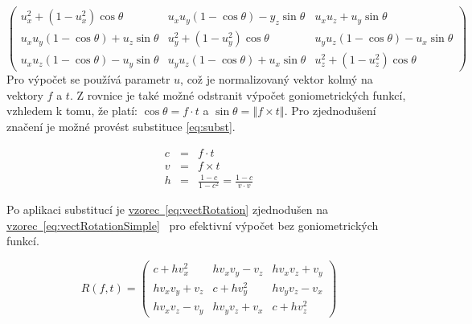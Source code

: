 \documentclass[czech,master]{diploma}
\newcommand{\fromVect}{f}
\newcommand{\toVect}{t}
\begin{document}
\begin{equation} \label{eq:vectRotation}
  \begin{pmatrix}
    u_x^2 + \left ( 1 - u_x^2\right ) \cos\theta                & u_x u_y \left ( 1 - \cos \theta \right ) - y_z \sin \theta & u_x u_z + u_y \sin \theta                                  \\
    u_x u_y \left ( 1 -  \cos \theta \right ) + u_z \sin \theta & u_y^2 + \left ( 1 - u_y^2\right ) \cos\theta               & u_y u_z \left ( 1 - \cos \theta \right ) - u_x \sin \theta \\
    u_x u_z \left ( 1 - \cos \theta \right ) - u_y \sin \theta  & u_y u_z \left ( 1 - \cos \theta \right ) + u_x \sin \theta & u_z^2 + \left ( 1 - u_z^2\right ) \cos\theta
  \end{pmatrix}
\end{equation}
Pro výpočet se používá parametr \(u\), což je normalizovaný vektor kolmý na vektory \(\fromVect\) a \(\toVect\). Z rovnice je také možné odstranit výpočet goniometrických funkcí, vzhledem k tomu, že platí: \(\cos \theta = \fromVect \cdot \toVect\) a \(\sin \theta = \left\Vert \fromVect \times \toVect \right\Vert\). Pro zjednodušení značení je možné provést substituce \hyperref[eq:subst]{\ref{eq:subst}}.

\begin{eqnarray} \label{eq:subst}
  c &=& \fromVect \cdot \toVect \nonumber\\
  v &=& \fromVect \times \toVect \nonumber\\
  h &=& \frac{1 - c}{1 - c^2} = \frac{1 - c}{v \cdot v} \nonumber
\end{eqnarray}

Po aplikaci substitucí je \hyperref[eq:vectRotation]{vzorec~\ref{eq:vectRotation}} zjednodušen na \hyperref[eq:vectRotationSimple]{vzorec~\ref{eq:vectRotationSimple}}~\cite{MollerHughesVectRotation} pro efektivní výpočet bez goniometrických funkcí.

\begin{equation} \label{eq:vectRotationSimple}
  R\left ( \fromVect, \toVect \right) = \begin{pmatrix}
    c + h v_x^2     & h v_x v_y - v_z & h v_x v_z + v_y \\
    h v_x v_y + v_z & c + h v_y^2     & h v_y v_z - v_x \\
    h v_x v_z - v_y & h v_y v_z + v_x & c + h v_z^2
  \end{pmatrix}
\end{equation}
\end{document}
